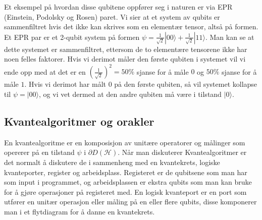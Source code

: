         Et eksempel på hvordan disse qubitene oppfører seg i naturen er via EPR (Einstein, Podolsky og Rosen) paret. Vi sier at et system av qubits er sammenfiltret hvis det ikke kan skrives som en elementær tensor, altså på formen. Et EPR par er et 2-qubit system på formen $\psi = \frac{1}{\sqrt{2}}|00\rangle + \frac{1}{\sqrt{2}}|11\rangle$. Man kan se at dette systemet er sammenfiltret, ettersom de to elementære tensorene ikke har noen felles faktorer. Hvis vi derimot måler den første qubiten i systemet vil vi ende opp med at det er en $(\frac{1}{\sqrt{2}})^2 = 50\%$ sjanse for å måle $0$ og $50\%$ sjanse for å måle $1$. Hvis vi derimot har målt $0$ på den første qubiten, så vil systemet kollapse til $\psi = |00\rangle$, og vi vet dermed at den andre qubiten må være i tilstand $|0\rangle$. 

\subsection{Kvantealgoritmer og orakler}

        En kvantealgoritme er en komposisjon av unitære operatorer og målinger som opererer på en tilstand $\psi$ i $\partial D(\mathcal{H})$. Når man diskuterer Kvantealgoritmer er det normalt å diskutere de i sammenheng med en kvantekrets, logiske kvanteporter, register og arbeidsplass. Registeret er de qubitsene som man har som input i programmet, og arbeidsplassen er ekstra qubits som man kan bruke for å gjøre operasjoner på registeret med. En logisk kvanteport er en port som utfører en unitær operasjon eller måling på en eller flere qubits, disse komponerer man i et flytdiagram for å danne en kvantekrets. 

